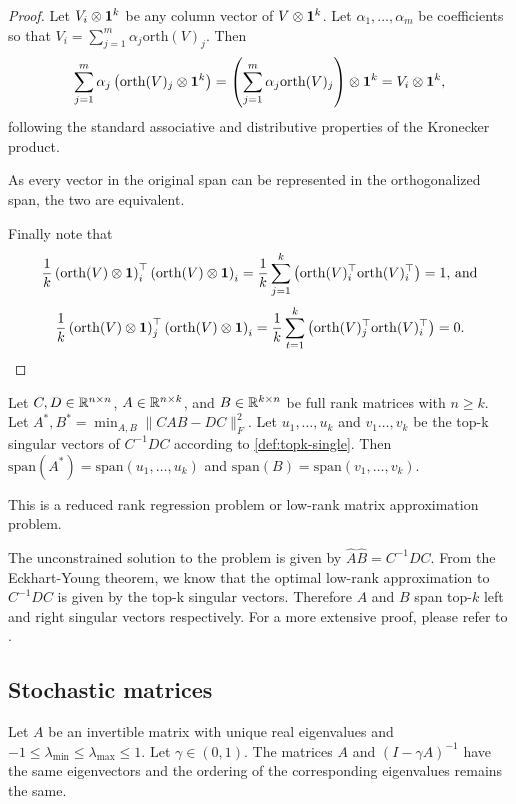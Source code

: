 \begin{proof}
    Let $V_i \otimes {\bm{1}}^k$ be any column vector of $V\otimes {\bm{1}}^k$. Let $\alpha_1,\dots,\alpha_m$ be coefficients so that $V_i = \sum_{j=1}^m \alpha_j \mathrm{orth}(V)_j$. Then $$\sum_{j=1}^m \alpha_j \left(\mathrm{orth}(V)_j \otimes {\bm{1}}^k\right) = \left(\sum_{j=1}^m \alpha_j \mathrm{orth}(V)_j\right) \otimes {\bm{1}}^k = V_i \otimes {\bm{1}}^k,$$ following the standard associative and distributive properties of the Kronecker product.

    As every vector in the original span can be represented in the orthogonalized span, the two are equivalent.

    Finally note that $$\frac{1}{k}\left(\mathrm{orth}(V) \otimes {\bm{1}}\right)_i^\top \left(\mathrm{orth}(V) \otimes {\bm{1}}\right)_i = \frac{1}{k}\sum_{j=1}^k \left(\mathrm{orth}(V)_i^\top \mathrm{orth}(V)_i^\top\right) = 1,\,\text{and}$$ $$\frac{1}{k}\left(\mathrm{orth}(V) \otimes {\bm{1}}\right)_j^\top \left(\mathrm{orth}(V) \otimes {\bm{1}}\right)_i = \frac{1}{k}\sum_{t=1}^k \left(\mathrm{orth}(V)_j^\top \mathrm{orth}(V)_i^\top\right) = 0.$$
\end{proof}

\begin{lemma}\label{lem:rrr}
    Let $C,D \in \mathbb{R}^{n \times n}$, $A\in\mathbb{R}^{n \times k}$, and $B\in\mathbb{R}^{k \times n}$ be full rank matrices with $n \geq k$. Let $A^*, B^* = \min_{A,B} \lVert CAB - DC\rVert^2_F$. Let ${u_1,\dots,u_k}$ and ${v_1\dots,v_k}$ be the top-k singular vectors of $C^{-1}DC$ according to \autoref{def:topk-single}. Then $\mathrm{span}(A^*) = \mathrm{span}({u_1,\dots,u_k})$ and $\mathrm{span}(B) = \mathrm{span}({v_1,\dots,v_k})$.
\end{lemma}

This is a reduced rank regression problem \parencite{izenman1975reduced} or low-rank matrix approximation problem. 

The unconstrained solution to the problem is given by $\hat{A}\hat{B} = C^{-1}DC$. From the Eckhart-Young theorem, we know that the optimal low-rank approximation to $C^{-1}DC$ is given by the top-k singular vectors.
Therefore $A$ and $B$ span top-$k$ left and right singular vectors respectively.
For a more extensive proof, please refer to \cite{izenman1975reduced}.

\subsection{Stochastic matrices}
\begin{lemma}\label{lem:spectrum_resolvent}
    Let $A$ be an invertible matrix with unique real eigenvalues and $-1 \leq \lambda_{\min} \leq \lambda_{\max} \leq 1 $. Let $\gamma\in(0,1)$.
    The matrices $A$ and $(I - \gamma A)^{-1}$ have the same eigenvectors and the ordering of the corresponding eigenvalues remains the same.
\end{lemma}


